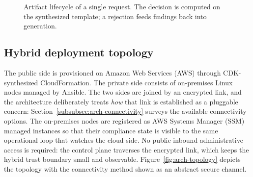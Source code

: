 \begin{figure}[ht]
\centering
{}
\caption{Artifact lifecycle of a single request. The decision is computed on the
synthesized template; a rejection feeds findings back into generation.}
\label{fig:arch-dataflow}
\end{figure}

\subsection{Hybrid deployment topology}
\label{subsec:arch-topology}

The public side is provisioned on Amazon Web Services (AWS) through CDK-synthesized
CloudFormation. The private side consists of on-premises Linux nodes managed by Ansible.
The two sides are joined by an encrypted link, and the architecture deliberately treats
\emph{how} that link is established as a pluggable concern:
Section~\ref{subsubsec:arch-connectivity} surveys the available connectivity options. The
on-premises nodes are registered as AWS Systems Manager (SSM) managed instances so that
their compliance state is visible to the same operational loop that watches the cloud
side. No public inbound administrative access is required: the control plane traverses the
encrypted link, which keeps the hybrid trust boundary small and observable.
Figure~\ref{fig:arch-topology} depicts the topology with the connectivity method shown as
an abstract secure channel.

